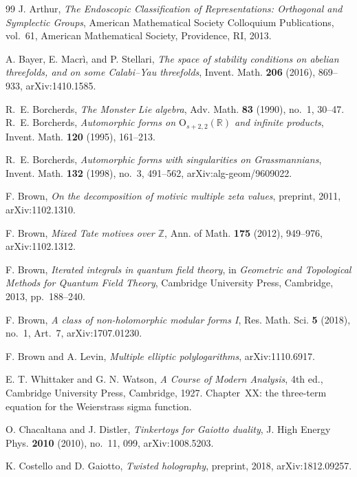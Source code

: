 \begin{thebibliography}{99}
J. Arthur, \emph{The Endoscopic Classification of Representations: Orthogonal and Symplectic Groups}, American Mathematical Society Colloquium Publications, vol.~61, American Mathematical Society, Providence, RI, 2013.

A. Bayer, E. Macr\`i, and P. Stellari, \emph{The space of stability conditions on abelian threefolds, and on some Calabi--Yau threefolds}, Invent. Math. \textbf{206} (2016), 869--933, arXiv:1410.1585.

R.~E. Borcherds, \emph{The Monster Lie algebra}, Adv. Math. \textbf{83} (1990), no.~1, 30--47.
R.~E. Borcherds, \emph{Automorphic forms on $\mathrm{O}_{s+2,2}(\mathbb{R})$ and infinite products}, Invent. Math. \textbf{120} (1995), 161--213.

R.~E. Borcherds, \emph{Automorphic forms with singularities on Grassmannians}, Invent. Math. \textbf{132} (1998), no.~3, 491--562, arXiv:alg-geom/9609022.


F. Brown, \emph{On the decomposition of motivic multiple zeta values}, preprint, 2011, arXiv:1102.1310.

F. Brown, \emph{Mixed Tate motives over $\mathbb{Z}$}, Ann. of Math. \textbf{175} (2012), 949--976, arXiv:1102.1312.

F. Brown, \emph{Iterated integrals in quantum field theory}, in \emph{Geometric and Topological Methods for Quantum Field Theory}, Cambridge University Press, Cambridge, 2013, pp.~188--240.

F. Brown, \emph{A class of non-holomorphic modular forms I}, Res. Math. Sci. \textbf{5} (2018), no.~1, Art.~7, arXiv:1707.01230.

F. Brown and A. Levin, \emph{Multiple elliptic polylogarithms}, arXiv:1110.6917.

E. T. Whittaker and G. N. Watson, \emph{A Course of Modern Analysis}, 4th ed., Cambridge University Press, Cambridge, 1927. Chapter~XX: the three-term equation for the Weierstrass sigma function.

O. Chacaltana and J. Distler, \emph{Tinkertoys for Gaiotto duality}, J. High Energy Phys. \textbf{2010} (2010), no.~11, 099, arXiv:1008.5203.

K. Costello and D. Gaiotto, \emph{Twisted holography}, preprint, 2018, arXiv:1812.09257.


\end{thebibliography}
